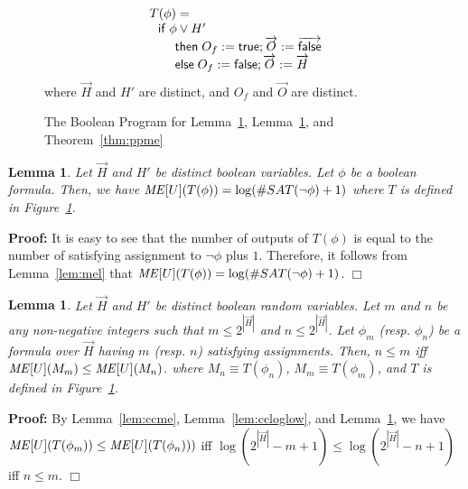 \documentclass{llncs}
\newtheorem{lemma}[theorem]{Lemma}
\newenvironment{proof}{\noindent\rm{\bf Proof:}}{\hbox{$\Box$}\vspace*{0.2\baselineskip}}
\newcommand{\vect}[1]{\overrightarrow{{#1}}}
\begin{document}
\begin{figure}[t]
\[
\begin{array}{l}
T(\phi)=\\
\ \ {\sf if}\;\phi\vee H'\\
\ \ \ \ \ \ {\sf then}\;O_f:={\sf true};\vect{O}:=\vect{{\sf false}}\\
\ \ \ \ \ \ {\sf else}\;O_f:={\sf false};\vect{O}:=\vect{H}
\end{array}
\]
where $\vect{H}$ and $H'$ are distinct, and $O_f$ and $\vect O$ are
distinct.
\caption{The Boolean Program for Lemma~\ref{lem:tme}, Lemma~\ref{lem:memonotone}, and Theorem~\ref{thm:ppme}}
\label{fig:boolenc2}
\end{figure}

\begin{lemma}
\label{lem:tme}
Let $\vect{H}$ and $H'$ be distinct boolean variables.  Let $\phi$ be
a boolean formula.  Then, we have ${\it
  ME}[U](T(\phi))=\log(\#SAT(\neg\phi)+1)$ where $T$ is defined in
Figure~\ref{fig:boolenc2}.
\end{lemma}
\begin{proof}
  It is easy to see that the number of outputs of $T(\phi)$ is equal
  to the number of satisfying assignment to $\neg \phi$ plus $1$.
  Therefore, it follows from Lemma~\ref{lem:mel} that ${\it
    ME}[U](T(\phi)) = \log(\#SAT(\neg\phi)+1)$.
\end{proof}

\begin{lemma}
\label{lem:memonotone}
Let $\vect H$ and $H'$ be distinct boolean random variables.  Let $m$
and $n$ be any non-negative integers such that $m\le 2^{|{\vect H}|}$
and $n\le 2^{|\vect{H}|}$.  Let $\phi_m$ (resp. $\phi_n$) be a formula
over $\vect H$ having $m$ (resp. $n$) satisfying assignments. Then,
$n\le m$ iff ${\it ME}[U](M_m)\le{\it ME}[U](M_n)$.  where $M_n\equiv
T(\phi_n)$, $M_m\equiv T(\phi_m)$, and $T$ is defined in
Figure~\ref{fig:boolenc2}.
\end{lemma}
\begin{proof}
  By Lemma~\ref{lem:ccme}, Lemma~\ref{lem:ccloglow}, and
  Lemma~\ref{lem:tme}, we have
${\it ME}[U](T(\phi_m))\le{\it ME}[U](T(\phi_n)))$
iff
$  \log(2^{|\vect H|}-m+1)\le\log(2^{|\vect H|}-n+1)$
iff
$
n\le m
$.
\end{proof}
\end{document}
